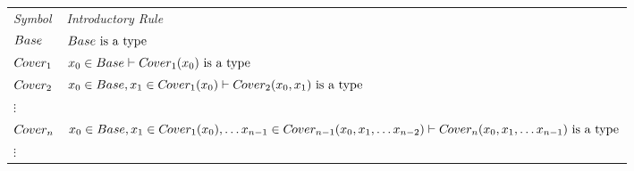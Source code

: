 
%
\begin{tabular}{>{\itshape}l l}
Symbol & \itshape{Introductory Rule} \\
$Base  $&$Base\mbox{ is a type}$\\
$C\kern-1pt over_{1} $&$x_0 \in Base \vdash C\kern-1pt over_{1}(x_0)\mbox{ is a type} $\\
$C\kern-1pt over_{2} $&$x_0 \in Base,x_1 \in C\kern-1pt over_{1}(x_0) \vdash C\kern-1pt over_{2}(x_0,x_1)\mbox{ is a type} $\\
$\vdots$  \\
$C\kern-1pt over_{n} $&$x_0 \in Base,x_1 \in C\kern-1pt over_{1}(x_0), \hdots x_{n-1} \in C\kern-1pt over_{n-1}(x_0,x_1,\hdots x_{n-2}) \vdash C\kern-1pt over_{n}(x_0,x_1,\hdots x_{n-1})\mbox{ is a type} $\\
$\vdots$   \\
\end{tabular} \\


\iffalse
\begin{gatrules}
\gatintros
\gatintroducing{Base}
\isT{Base} \\
\gatintroducing{Cov_1\\Cov_2\\\vdots \\ \vdots\\Cov_n\\ \vdots \\ \vdots}
\begin{gatgroup}{\ofT{x_0}{Base}}
  \gatleaf[5cm]{}{\isT{Cov_1(x_0)}} \\
  \begin{gatgroup}{\ofT{x_1}{Cov_1(x_0)}}
    \gatleaf[5cm]{}{\isT{Cov_2(x_0,x_1)}} \\
    \vdots \\
    \vdots \\
    \begin{gatgroup}{\ofT{x_{n-1}} {Cov_{n-1}(x_0,...x_{n-2})}\iddots}
    \gatleaf[5cm]{}{\isT{Cov_n(x_0,...x_{n-1})}} \\
    \vdots \\
    \vdots
    \end{gatgroup}
  \end{gatgroup}
\end{gatgroup}
\end{gatrules}
\fi
